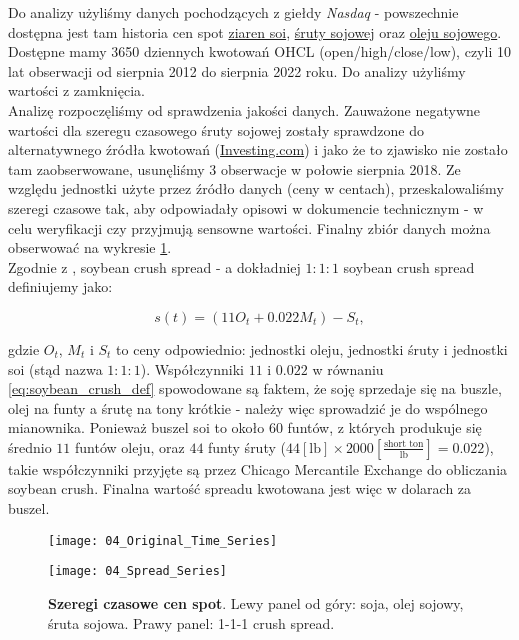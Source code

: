 Do analizy użyliśmy danych pochodzących z giełdy \emph{Nasdaq} - powszechnie dostępna jest tam historia cen spot \href{https://www.nasdaq.com/market-activity/commodities/zs/historical}{ziaren soi},  \href{https://www.nasdaq.com/market-activity/commodities/zm/historical}{śruty sojowej} oraz \href{https://www.nasdaq.com/market-activity/commodities/zl/historical}{oleju sojowego}. Dostępne mamy 3650 dziennych kwotowań OHCL (open/high/close/low), czyli 10 lat obserwacji od sierpnia 2012 do sierpnia 2022 roku. Do analizy użyliśmy wartości z zamknięcia.\\

Analizę rozpoczęliśmy od sprawdzenia jakości danych. Zauważone negatywne wartości dla szeregu czasowego śruty sojowej zostały sprawdzone do alternatywnego źródła kwotowań (\href{https://www.investing.com/commodities/us-soybean-meal-historical-data}{Investing.com}) i jako że to zjawisko nie zostało tam zaobserwowane, usunęliśmy 3 obserwacje w połowie sierpnia 2018. Ze względu jednostki użyte przez źródło danych (ceny w centach), przeskalowaliśmy szeregi czasowe tak, aby odpowiadały opisowi w dokumencie technicznym \cite{CME_soybean} - w celu weryfikacji czy przyjmują sensowne wartości. Finalny zbiór danych można obserwować na wykresie \ref{fig:original_time_series}.\\

Zgodnie z \cite{CME_soybean}, soybean crush spread - a dokładniej $1\colon1\colon1$ soybean crush spread definiujemy jako:

\begin{equation}
	s(t) = (11 O_t + 0.022 M_t) - S_t,
	\label{eq:soybean_crush_def}
\end{equation}

gdzie $O_t$, $M_t$ i $S_t$ to ceny odpowiednio: jednostki oleju, jednostki śruty i jednostki soi (stąd nazwa $1\colon1\colon1$). Współczynniki $11$ i $0.022$ w równaniu \ref{eq:soybean_crush_def} spowodowane są faktem, że soję sprzedaje się na buszle, olej na funty a śrutę na tony krótkie - należy więc sprowadzić je do wspólnego mianownika. Ponieważ buszel soi to około $60$ funtów, z których produkuje się średnio $11$ funtów oleju, oraz $44$ funty śruty ($44[\text{lb}]\times 2000[\frac{\text{short ton}}{\text{lb}}] = 0.022$), takie współczynniki przyjęte są przez Chicago Mercantile Exchange do obliczania soybean crush. Finalna wartość spreadu kwotowana jest więc w dolarach za buszel.

\begin{figure}[h]
	\centering
	\begin{minipage}{0.45\linewidth}
	\texttt{[image: 04\_Original\_Time\_Series]}
	\end{minipage}
	\begin{minipage}{0.45\linewidth}
	\texttt{[image: 04\_Spread\_Series]}
	\end{minipage}
	\caption{\textbf{Szeregi czasowe cen spot}. Lewy panel od góry: soja, olej sojowy, śruta sojowa. Prawy panel: 1-1-1 crush spread. \label{fig:original_time_series}}
\end{figure}

